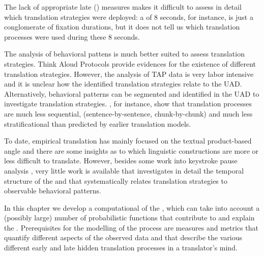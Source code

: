 \documentclass[output=paper]{LSP/langsci}
\begin{document}
The lack of appropriate late () measures makes it difficult to assess in detail which translation strategies were deployed: a  of 8 seconds, for instance, is just a conglomerate of fixation durations, but it does not tell us which translation processes were used during these 8 seconds. 


The analysis of behavioral pattens is much better suited to assess translation strategies. Think Aloud Protocols \citep{Krings1986Translation, Loerscher1991, Jaaskelainen1991} provide evidences for the existence of different translation strategies. However, the analysis of TAP data is very labor intensive and it is unclear how the identified translation strategies relate to the UAD. Alternatively, behavioral patterns can be segmented and identified in the UAD to investigate translation strategies.  \citet{Schaeffer2016ActivityUnits}, for instance, show that translation processes are much  less  sequential,  (sentence-by-sentence, chunk-by-chunk)  and  much  less stratificational than predicted by earlier translation models. 

To date, empirical translation  has mainly focused on the textual product-based angle and there are some insights as to which linguistic constructions are more or less difficult to translate. However, besides some work into keystroke pause analysis \citep{Immonen2006, Lacruz2012}, very little work is available that investigates in detail the temporal structure of the  and that systematically relates translation strategies to observable behavioral patterns. 

In this chapter we develop a computational  of the , which can take into account a (possibly large) number of probabilistic functions that contribute to and explain the . Prerequisites for the modelling of the process are measures and metrics that quantify different aspects of the observed data and that describe the various different early and late hidden translation processes in a translator's mind. 

\end{document}
